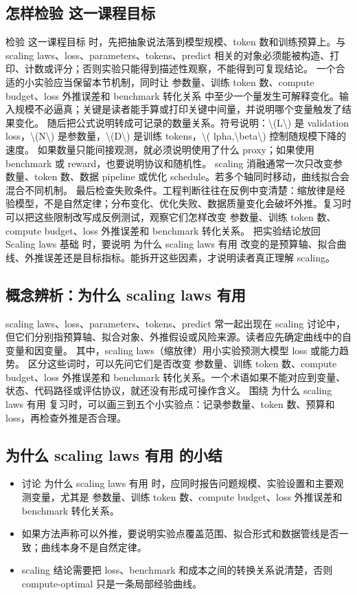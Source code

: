 \documentclass[a4paper]{article}
\begin{document}
\subsection{怎样检验 这一课程目标}
检验 这一课程目标 时，先把抽象说法落到模型规模、token 数和训练预算上。与 scaling laws、loss、parameters、tokens、predict 相关的对象必须能被构造、打印、计数或评分；否则实验只能得到描述性观察，不能得到可复现结论。
一个合适的小实验应当保留本节机制，同时让 参数量、训练 token 数、compute budget、loss 外推误差和 benchmark 转化关系 中至少一个量发生可解释变化。输入规模不必逼真；关键是读者能手算或打印关键中间量，并说明哪个变量触发了结果变化。
随后把公式说明转成可记录的数量关系。符号说明：\textbackslash{}(L\textbackslash{}) 是 validation loss，\textbackslash{}(N\textbackslash{}) 是参数量，\textbackslash{}(D\textbackslash{}) 是训练 tokens，\textbackslash{}( lpha,\textbackslash{}beta\textbackslash{}) 控制随规模下降的速度。 如果数量只能间接观测，就必须说明使用了什么 proxy；如果使用 benchmark 或 reward，也要说明协议和随机性。
scaling 消融通常一次只改变参数量、token 数、数据 pipeline 或优化 schedule。若多个轴同时移动，曲线拟合会混合不同机制。
最后检查失败条件。工程判断往往在反例中变清楚：缩放律是经验模型，不是自然定律；分布变化、优化失败、数据质量变化会破坏外推。复习时可以把这些限制改写成反例测试，观察它们怎样改变 参数量、训练 token 数、compute budget、loss 外推误差和 benchmark 转化关系。
把实验结论放回 Scaling laws 基础 时，要说明 为什么 scaling laws 有用 改变的是预算轴、拟合曲线、外推误差还是目标指标。能拆开这些因素，才说明读者真正理解 scaling。
\subsection{概念辨析：为什么 scaling laws 有用}
scaling laws、loss、parameters、tokens、predict 常一起出现在 scaling 讨论中，但它们分别指预算轴、拟合对象、外推假设或风险来源。读者应先确定曲线中的自变量和因变量。
其中，scaling laws（缩放律）用小实验预测大模型 loss 或能力趋势。
区分这些词时，可以先问它们是否改变 参数量、训练 token 数、compute budget、loss 外推误差和 benchmark 转化关系。一个术语如果不能对应到变量、状态、代码路径或评估协议，就还没有形成可操作含义。
围绕 为什么 scaling laws 有用 复习时，可以画三到五个小实验点：记录参数量、token 数、预算和 loss，再检查外推是否合理。
\subsection{为什么 scaling laws 有用 的小结}
\begin{itemize}
\item 讨论 为什么 scaling laws 有用 时，应同时报告问题规模、实验设置和主要观测变量，尤其是 参数量、训练 token 数、compute budget、loss 外推误差和 benchmark 转化关系。
\item 如果方法声称可以外推，要说明实验点覆盖范围、拟合形式和数据管线是否一致；曲线本身不是自然定律。
\item scaling 结论需要把 loss、benchmark 和成本之间的转换关系说清楚，否则 compute-optimal 只是一条局部经验曲线。
\end{itemize}
\end{document}
